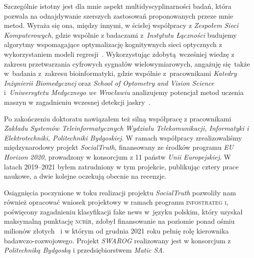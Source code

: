 Szczególnie istotny jest dla mnie aspekt multidyscyplinarności badań, która pozwala na odnajdywanie szerszych zastosowań  proponowanych przeze mnie metod. Wyraża się ona, między innymi, w ścisłej współpracy z \emph{Zespołem Sieci Komputerowych}, gdzie wspólnie z badaczami z~\emph{Instytutu Łączności} budujemy algorytmy wspomagające optymalizację kognitywnych sieci optycznych z wykorzystaniem modeli regresji~. Wykorzystując zdobytą wcześniej wiedzę z zakresu przetwarzania cyfrowych sygnałów wielowymiarowych, angażuję się także w~badania z~zakresu bioinformatyki, gdzie wspólnie z~pracownikami \emph{Katedry Inżynierii Biomedycznej} oraz \emph{School of Optometry and Vision Science} i~\emph{Uniwersytetu Medycznego we Wrocławiu} analizujemy potencjał metod uczenia maszyn w zagadnieniu wczesnej detekcji jaskry~.

Po zakończeniu doktoratu nawiązałem też silną współpracę z pracownikami \emph{Zakładu Systemów Teleinformatycznych Wydziału Telekomunikacji, Informatyki i Elektrotechniki, Politechniki Bydgoskiej}. W ramach współpracy zrealizowaliśmy międzynarodowy projekt \emph{SocialTruth}, finansowany ze środków programu \emph{EU Horizon 2020}, prowadzony w konsorcjum z 11 państw \emph{Unii Europejskiej}. W latach 2019--2021 byłem zatrudniony w tym projekcie, publikując cztery prace naukowe, a dwie kolejne oczekują obecnie na recenzje.

Osiągnięcia poczynione w toku realizacji projektu \emph{SocialTruth} pozwoliły nam również opracować wniosek projektowy w ramach programu \textsc{infostrateg i}, poświęcony zagadnieniu klasyfikacji fake news w~języku polskim, który uzyskał maksymalną punktację \textsc{ncb}i\textsc{r}, zdobył finansowanie na poziomie ponad ośmiu milionów złotych~ i w którym od grudnia 2021 roku pełnię rolę kierownika badawczo-rozwojowego. Projekt \emph{SWAROG} realizowany jest w konsorcjum z \emph{Politechniką Bydgoską} i przedsiębiorstwem \emph{Matic SA}.

